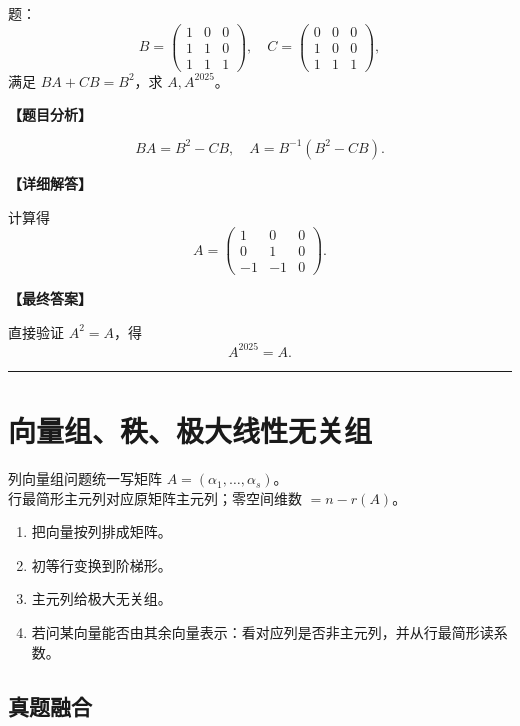 ﻿\documentclass[11pt,a4paper,UTF8]{ctexart}
\begin{document}
\begin{answerbox}[2024--2025 解答二：BA+CB=\ensuremath{B^2} 与 \ensuremath{A^{2025}}]
题：
\[
B=\begin{pmatrix}1&0&0\\1&1&0\\1&1&1\end{pmatrix},\quad
C=\begin{pmatrix}0&0&0\\1&0&0\\1&1&1\end{pmatrix},
\]
满足 $BA+CB=B^2$，求 $A,A^{2025}$。

\textbf{【题目分析】}

\[BA=B^2-CB,\quad A=B^{-1}(B^2-CB).\]

\textbf{【详细解答】}

计算得
\[
A=\begin{pmatrix}
1&0&0\\
0&1&0\\
-1&-1&0
\end{pmatrix}.
\]

\textbf{【最终答案】}

直接验证 $A^2=A$，得
\[A^{2025}=A.\]
\end{answerbox}
\bigskip\hrule\bigskip

\section{向量组、秩、极大线性无关组}

\begin{identifybox}[高亮公式]
列向量组问题统一写矩阵 $A=(\alpha_1,\ldots,\alpha_s)$。\\
行最简形主元列对应原矩阵主元列；零空间维数 $=n-r(A)$。\\
\end{identifybox}

\begin{templatebox}[考场模板]

\begin{enumerate}
\item 把向量按列排成矩阵。
\item 初等行变换到阶梯形。
\item 主元列给极大无关组。
\item 若问某向量能否由其余向量表示：看对应列是否非主元列，并从行最简形读系数。
\end{enumerate}

\end{templatebox}
\subsection{真题融合}
\end{document}
